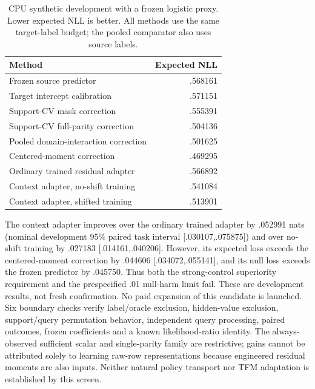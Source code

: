 \documentclass[10pt]{article}
\begin{document}
\begin{table}[t]
\centering\small
\caption{CPU synthetic development with a frozen logistic proxy. Lower expected NLL is better. All methods use the same target-label budget; the pooled comparator also uses source labels.}
\label{tab:policy-context}
\begin{tabular}{lr}\toprule
Method & Expected NLL\\\midrule
Frozen source predictor & .568161\\
Target intercept calibration & .571151\\
Support-CV mask correction & .555391\\
Support-CV full-parity correction & .504136\\
Pooled domain-interaction correction & .501625\\
Centered-moment correction & .469295\\
Ordinary trained residual adapter & .566892\\
Context adapter, no-shift training & .541084\\
Context adapter, shifted training & .513901\\\bottomrule
\end{tabular}
\end{table}

The context adapter improves over the ordinary trained adapter by .052991 nats (nominal development 95\% paired task interval [.030107,.075875]) and over no-shift training by .027183 [.014161,.040206]. However, its expected loss exceeds the centered-moment correction by .044606 [.034072,.055141], and its null loss exceeds the frozen predictor by .045750. Thus both the strong-control superiority requirement and the prespecified .01 null-harm limit fail. These are development results, not fresh confirmation. No paid expansion of this candidate is launched. Six boundary checks verify label/oracle exclusion, hidden-value exclusion, support/query permutation behavior, independent query processing, paired outcomes, frozen coefficients and a known likelihood-ratio identity. The always-observed sufficient scalar and single-parity family are restrictive; gains cannot be attributed solely to learning raw-row representations because engineered residual moments are also inputs. Neither natural policy transport nor TFM adaptation is established by this screen.
\end{document}
